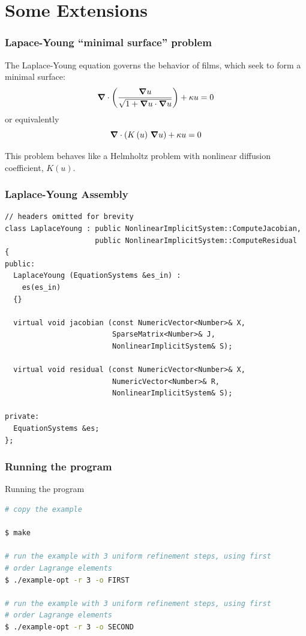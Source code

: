 \section{Some Extensions}






\frame
{
  \Large
  \begin{block}{}
  \end{block}
}

\frame
{
  \frametitle{Lapace-Young ``minimal surface'' problem}

  The Laplace-Young equation governs the behavior of films, which seek to form a minimal surface:
  \begin{equation*}
    {\boldsymbol{\nabla}} {}\cdot\left(\frac{{\boldsymbol{\nabla}} {u}}{\sqrt{1 + {\boldsymbol{\nabla}} {u}\cdot{\boldsymbol{\nabla}} {u}}}\right) + \kappa u = 0
  \end{equation*}
  or equivalently
  \begin{equation*}
    {\boldsymbol{\nabla}} {}\cdot\left(K\left(u\right)\,{\boldsymbol{\nabla}} {u}\right) + \kappa u = 0
  \end{equation*}
  
  This problem behaves like a Helmholtz problem with nonlinear diffusion coefficient, $K(u)$.
}

\begin{frame}
  \frametitle{Laplace-Young Assembly}
  \begin{lstlisting}
// headers omitted for brevity
class LaplaceYoung : public NonlinearImplicitSystem::ComputeJacobian,
                     public NonlinearImplicitSystem::ComputeResidual
{
public:  
  LaplaceYoung (EquationSystems &es_in) :
    es(es_in)
  {}

  virtual void jacobian (const NumericVector<Number>& X,
                         SparseMatrix<Number>& J,
                         NonlinearImplicitSystem& S);

  virtual void residual (const NumericVector<Number>& X,
                         NumericVector<Number>& R,
                         NonlinearImplicitSystem& S); 

private:
  EquationSystems &es;
};
  \end{lstlisting}
\end{frame}
\begin{frame}[fragile]
  \frametitle{Running the program}
    \begin{block}{Running the program}
    \begin{lstlisting}[language=bash]
# copy the example

$ make

# run the example with 3 uniform refinement steps, using first
# order Lagrange elements
$ ./example-opt -r 3 -o FIRST 

# run the example with 3 uniform refinement steps, using first
# order Lagrange elements
$ ./example-opt -r 3 -o SECOND
    \end{lstlisting}
  \end{block}
\end{frame}


